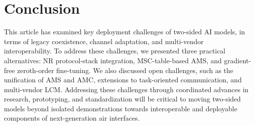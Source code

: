 \documentclass[10pt,twocolumn]{IEEEtran}
\begin{document}
\section{Conclusion}
This article has examined key deployment challenges of two-sided AI models, in terms of legacy coexistence, channel adaptation, and multi-vendor interoperability. To address these challenges, we presented three practical alternatives: NR protocol-stack integration, MSC-table-based AMS, and gradient-free zeroth-order fine-tuning. We also discussed open challenges, such as the unification of AMS and AMC, extensions to task-oriented communication, and multi-vendor LCM. Addressing these challenges through coordinated advances in research, prototyping, and standardization will be critical to moving two-sided models beyond isolated demonstrations towards interoperable and deployable components of next-generation air interfaces.











\end{document}
